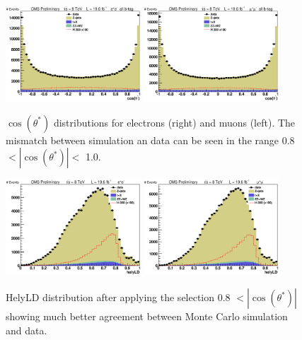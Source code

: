 \begin{figure}[htb!]
\begin{center}
\centerline{
\includegraphics[width=0.45\textwidth]{presentation/defense/images/preselection/el/costhetast.eps}
\includegraphics[width=0.45\textwidth]{presentation/defense/images/preselection/mu/costhetast.eps}
}
\caption{$\cos(\theta^*)$ distributions for electrons (right) and muons (left). The mismatch between simulation an data can be seen in the range 0.8 $< |\cos(\theta^*)| <$ 1.0. 
}
\label{fig:costhetast}
\end{center}
\end{figure}
\begin{figure}[htb!]
\begin{center}
\centerline{
\includegraphics[width=0.45\textwidth]{presentation/defense/images/costhetast_cut/el/helyLD.eps}
\includegraphics[width=0.45\textwidth]{presentation/defense/images/costhetast_cut/mu/helyLD.eps}
}
\caption{HelyLD distribution after applying the selection 0.8 $< |\cos(\theta^*)|$ showing much better agreement between Monte Carlo simulation and data.
}
\label{fig:helyld_cut_costhetast}
\end{center}
\end{figure}





